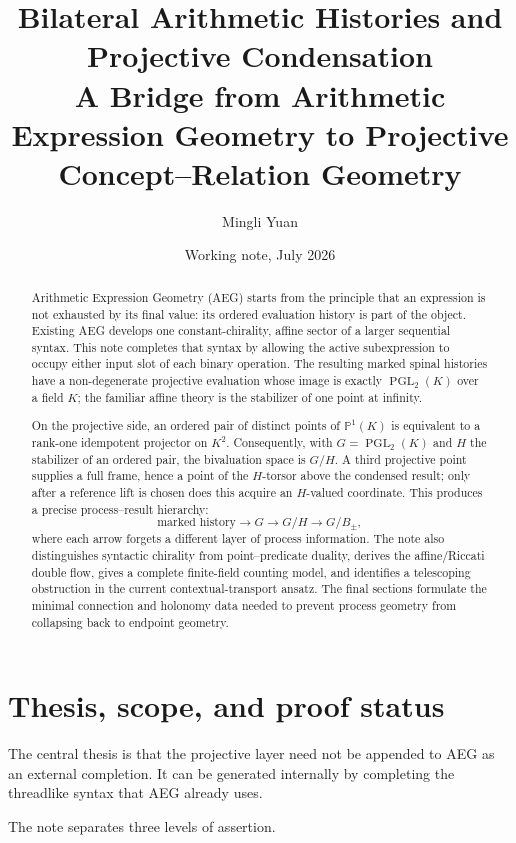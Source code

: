 \documentclass[11pt]{article}
\title{\textbf{Bilateral Arithmetic Histories and Projective Condensation}\\
\large A Bridge from Arithmetic Expression Geometry to Projective Concept--Relation Geometry}
\author{Mingli Yuan}
\date{Working note, July 2026}
\theoremstyle{definition}
\theoremstyle{remark}
\newcommand{\PGL}{\operatorname{PGL}}
\newcommand{\PP}{\mathbb P}
\begin{document}
\maketitle

\begin{abstract}
Arithmetic Expression Geometry (AEG) starts from the principle that an
expression is not exhausted by its final value: its ordered evaluation history
is part of the object.  Existing AEG develops one constant-chirality,
affine sector of a larger sequential syntax.  This note completes that syntax
by allowing the active subexpression to occupy either input slot of each binary
operation.  The resulting marked spinal histories have a non-degenerate
projective evaluation whose image is exactly \(\PGL_2(K)\) over a field \(K\);
the familiar affine theory is the stabilizer of one point at infinity.

On the projective side, an ordered pair of distinct points of
\(\PP^1(K)\) is equivalent to a rank-one idempotent projector on \(K^2\).
Consequently, with \(G=\PGL_2(K)\) and \(H\) the stabilizer of an ordered
pair, the bivaluation space is \(G/H\).  A third projective point supplies a
full frame, hence a point of the \(H\)-torsor above the condensed result; only
after a reference lift is chosen does this acquire an \(H\)-valued coordinate.
This produces a precise process--result hierarchy:
\[
\text{marked history}
\longrightarrow
G
\longrightarrow
G/H
\longrightarrow
G/B_\pm,
\]
where each arrow forgets a different layer of process information.  The note
also distinguishes syntactic chirality from point--predicate duality, derives
the affine/Riccati double flow, gives a complete finite-field counting model,
and identifies a telescoping obstruction in the current contextual-transport
ansatz.  The final sections formulate the minimal connection and holonomy data
needed to prevent process geometry from collapsing back to endpoint geometry.
\end{abstract}

\section{Thesis, scope, and proof status}

The central thesis is that the projective layer need not be appended to AEG as
an external completion.  It can be generated internally by completing the
threadlike syntax that AEG already uses.

The note separates three levels of assertion.
\end{document}
